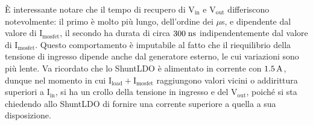 \`E interessante notare che il tempo di recupero di $\mathrm{V_{in}}$ e $\mathrm{V_{out}}$ differiscono notevolmente: il primo è molto più lungo, dell'ordine dei $\mu$s, e dipendente dal valore di $\mathrm{I_{mosfet}}$, il secondo ha durata di circa $300 \rm \; ns$ indipendentemente dal valore di $\mathrm{I_{mosfet}}$.
Questo comportamento è imputabile al fatto che il riequilibrio della tensione di ingresso dipende anche dal generatore esterno, le cui variazioni sono più lente.
Va ricordato che lo ShuntLDO è alimentato in corrente con $1.5 \rm \, A$, dunque nel momento in cui $\mathrm{I_{load}+I_{mosfet}}$ raggiungono valori vicini o addirittura superiori  a $\mathrm{I_{in}}$, si ha un crollo della tensione in ingresso e del $\mathrm{V_{out}}$, poiché si sta chiedendo allo ShuntLDO di fornire una corrente superiore a quella a sua disposizione.

